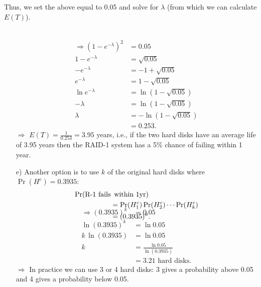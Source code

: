\documentclass[12pt]{article}
\begin{document}
{\begin{minipage}[t]{0.98\textwidth}
\begin{minipage}[t]{0.47\textwidth}
\begin{enumerate}[a)]
Thus, we set the above equal to 0.05 and solve for $\lambda$ (from which we can calculate $E(T)$).
\end{enumerate}
\end{minipage}\hspace{0.04\textwidth}
\begin{minipage}[t]{0.47\textwidth}
\begin{enumerate}
\item[] \quad\\[-1.3cm]
\begin{align*}
\Rightarrow (1 - e^{-\lambda})^2 &= 0.05 \\
1- e^{-\lambda} &= \sqrt{0.05} \\
 - e^{-\lambda} &= -1+\sqrt{0.05} \\
  e^{-\lambda} &= 1-\sqrt{0.05} \\
  \ln e^{-\lambda} &= \ln ( 1-\sqrt{0.05} ) \\
-\lambda &= \ln ( 1-\sqrt{0.05} ) \\
\lambda &= -\ln ( 1-\sqrt{0.05} ) \\
&= 0.253.
\end{align*}
$\Rightarrow$ $E(T) = \frac{1}{0.253} = 3.95$ years, i.e., if the two hard disks have an average life of 3.95 years then the RAID-1 system has a 5\% chance of failing within 1 year.
\item[e)] Another option is to use $k$ of the original hard disks where $\Pr(H^c) = 0.3935$:
    \begin{align*}
\Pr(\text{R-1 fails}&\text{\, within 1yr}) \\
&= \Pr(H_1^c)\Pr(H_2^c)\cdots\Pr(H_k^c)\\
&=(0.3935)^k.\\[-1cm]
\end{align*}
\begin{align*}
\Rightarrow (0.3935)^k &= 0.05 \\
\ln (0.3935)^k &= \ln 0.05 \\
k \, \ln (0.3935) &= \ln 0.05 \\
k  &= \frac{\ln 0.05}{\ln (0.3935)} \\
&= 3.21 \text{ hard disks}.
\end{align*}
$\Rightarrow$ In practice we can use 3 or 4 hard disks: 3 gives a probability above 0.05 and 4 gives a probability below 0.05.
\end{enumerate}
\end{minipage}
\end{minipage}}\vspace{0.03\textwidth}
\end{document}
